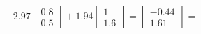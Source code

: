 \documentclass[preview]{standalone}
\begin{document}
\begin{align*}
-2.97 \begin{bmatrix} 0.8 \\ 0.5 \end{bmatrix} + 1.94 \begin{bmatrix} 1 \\ 1.6 \end{bmatrix} = \begin{bmatrix} -0.44 \\ 1.61 \end{bmatrix} =
\end{align*}
\end{document}
